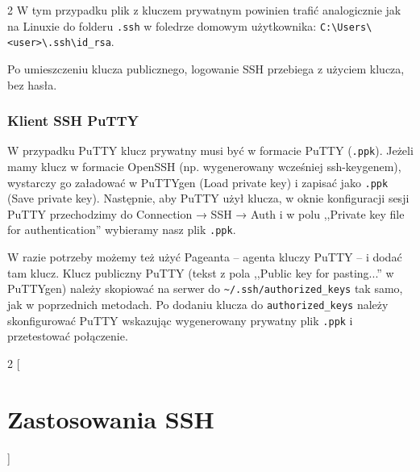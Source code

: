 \documentclass{article}
\begin{document}
\begin{multicols}{2}
W tym przypadku plik z kluczem prywatnym powinien trafić analogicznie jak na Linuxie do folderu \verb|.ssh| w foledrze domowym użytkownika: \verb|C:\Users\<user>\.ssh\id_rsa|.


Po umieszczeniu klucza publicznego, logowanie SSH przebiega z użyciem klucza, bez hasła.

\subsubsection{Klient SSH PuTTY}
W przypadku PuTTY klucz prywatny musi być w formacie PuTTY (\verb|.ppk|). Jeżeli mamy klucz w formacie OpenSSH (np. wygenerowany wcześniej ssh-keygenem), wystarczy go załadować w PuTTYgen (Load private key) i zapisać jako \verb|.ppk| (Save private key). Następnie, aby PuTTY użył klucza, w oknie konfiguracji sesji PuTTY przechodzimy do Connection → SSH → Auth i w polu ,,Private key file for authentication'' wybieramy nasz plik \verb|.ppk|.

W razie potrzeby możemy też użyć Pageanta -- agenta kluczy PuTTY -- i dodać tam klucz. Klucz publiczny PuTTY (tekst z pola ,,Public key for pasting...'' w PuTTYgen) należy skopiować na serwer do \verb|~/.ssh/authorized_keys| tak samo, jak w poprzednich metodach. Po dodaniu klucza do \verb|authorized_keys| należy skonfigurować PuTTY wskazując wygenerowany prywatny plik \verb|.ppk| i przetestować połączenie.

\end{multicols}

\begin{multicols}{2}
[
\section{Zastosowania SSH}
]

\end{multicols}
\end{document}
